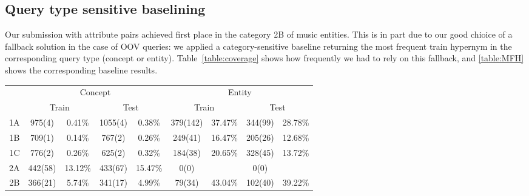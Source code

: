 \documentclass[11pt,a4paper]{article}
\begin{document}
\subsection{Query type sensitive baselining}

Our submission with attribute pairs achieved first place in the category 2B of
music entities. This is in part due to our good chioice of a fallback solution
in the case of OOV queries: we applied a category-sensitive baseline returning
the most frequent train hypernym in the corresponding query type (concept or
entity).  Table~\ref{table:coverage} shows how frequently we had to rely on
this fallback, and \autoref{table:MFH} shows the corresponding baseline
results.

\begin{table*}
	\centering
	\begin{tabular}{r|cccc|cccc}
    \toprule
		& \multicolumn{4}{c|}{Concept} & \multicolumn{4}{c}{Entity} \\
    & \multicolumn{2}{c}{Train} &
     \multicolumn{2}{c|}{Test} &
     \multicolumn{2}{c}{Train} &
     \multicolumn{2}{c}{Test} \\
     \midrule
1A & 975(4) & 0.41\%	&1055(4) & 0.38\%	&379(142) & 37.47\%	&344(99) & 28.78\% \\
1B & 709(1) & 0.14\%	&767(2) & 0.26\%	&249(41) & 16.47\%	&205(26) & 12.68\% \\
1C & 776(2) & 0.26\%	&625(2) & 0.32\%	&184(38) & 20.65\%	&328(45) & 13.72\% \\
2A & 442(58) & 13.12\%	&433(67) & 15.47\%	&0(0) & 	& 0(0) & \\
2B & 366(21) & 5.74\%	&341(17) & 4.99\%	&79(34) & 43.04\%	&102(40) & 39.22\% \\
\bottomrule
	\end{tabular}
  \caption{Number of in-vocabulary (and out-of-vocabulary, OOV) queries per query
  types.  The ratio of the latter is also shown.}
\label{table:coverage}
\end{table*}
\end{document}
